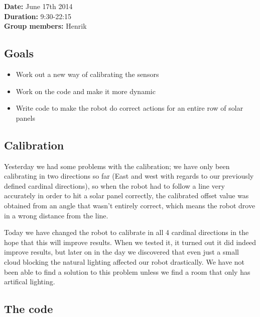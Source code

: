 \textbf{Date:} June 17th 2014\\\textbf{Duration:}
9:30-22:15\\\textbf{Group members:} Henrik

\subsection{Goals}

\begin{itemize}
\itemsep1pt\parskip0pt
\item
  Work out a new way of calibrating the sensors
\item
  Work on the code and make it more dynamic
\item
  Write code to make the robot do correct actions for an entire row of
  solar panels
\end{itemize}

\subsection{Calibration}

Yesterday we had some problems with the calibration; we have only been
calibrating in two directions so far (East and west with regards to our
previously defined cardinal directions), so when the robot had to follow
a line very accurately in order to hit a solar panel correctly, the
calibrated offset value was obtained from an angle that wasn't entirely
correct, which means the robot drove in a wrong distance from the line.

Today we have changed the robot to calibrate in all 4 cardinal
directions in the hope that this will improve results. When we tested
it, it turned out it did indeed improve results, but later on in the day
we discovered that even just a small cloud blocking the natural lighting
affected our robot drastically. We have not been able to find a solution
to this problem unless we find a room that only has artifical lighting.

\subsection{The code}

